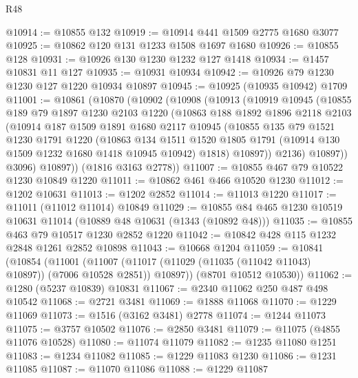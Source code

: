 \begin{lexlean}{R48}
\begin{coremodule}
@10914 := @10855 @132
@10919 := @10914 @441 @1509 @2775 @1680 @3077
@10925 := @10862 @120 @131 @1233 @1508 @1697 @1680
@10926 := @10855 @128
@10931 := @10926 @130 @1230 @1232 @127 @1418
@10934 := @1457 @10831 @11 @127
@10935 := @10931 @10934
@10942 := @10926 @79 @1230 @1230 @127 @1220 @10934 @10897
@10945 := @10925 (@10935 @10942) @1709
@11001 := @10861
    (@10870
      (@10902
        (@10908
          (@10913
            (@10919
              @10945
              (@10855
                @189
                @79
                @1897
                @1230
                @2103
                @1220
                (@10863
                  @188
                  @1892
                  @1896
                  @2118
                  @2103
                  (@10914
                    @187
                    @1509
                    @1891
                    @1680
                    @2117
                    @10945
                    (@10855
                      @135
                      @79
                      @1521
                      @1230
                      @1791
                      @1220
                      (@10863
                        @134
                        @1511
                        @1520
                        @1805
                        @1791
                        (@10914 @130 @1509 @1232 @1680 @1418 @10945 @10942)
                        @1818)
                      @10897))
                  @2136)
                @10897))
            @3096)
          @10897))
      (@1816 @3163 @2778))
@11007 := @10855 @467 @79 @10522 @1230 @10849 @1220
@11011 := @10862 @461 @466 @10520 @1230
@11012 := @1202 @10631
@11013 := @1202 @2852
@11014 := @11013 @1220
@11017 := @11011 (@11012 @11014) @10849
@11029 := @10855 @84 @465 @1230 @10519 @10631 @11014 (@10889 @48 @10631 (@1343 (@10892 @48)))
@11035 := @10855 @463 @79 @10517 @1230 @2852 @1220
@11042 := @10842 @428 @115 @1232 @2848 @1261 @2852 @10898
@11043 := @10668 @1204
@11059 := @10841
    (@10854
      (@11001
        (@11007 (@11017 (@11029 (@11035 (@11042 @11043) @10897)) (@7006 @10528 @2851)) @10897))
      (@8701 @10512 @10530))
@11062 := @1280 (@5237 @10839) @10831
@11067 := @2340 @11062 @250 @487 @498 @10542
@11068 := @2721 @3481
@11069 := @1888 @11068
@11070 := @1229 @11069
@11073 := @1516 (@3162 @3481) @2778
@11074 := @1244 @11073
@11075 := @3757 @10502
@11076 := @2850 @3481
@11079 := @11075 (@4855 @11076 @10528)
@11080 := @11074 @11079
@11082 := @1235 @11080 @1251
@11083 := @1234 @11082
@11085 := @1229 @11083 @1230
@11086 := @1231 @11085
@11087 := @11070 @11086
@11088 := @1229 @11087

\end{coremodule}
\end{lexlean}
